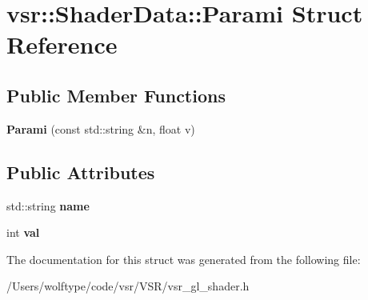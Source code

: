 \hypertarget{structvsr_1_1_shader_data_1_1_parami}{\section{vsr\-:\-:Shader\-Data\-:\-:Parami Struct Reference}
\label{structvsr_1_1_shader_data_1_1_parami}
}
\subsection*{Public Member Functions}
\begin{DoxyCompactItemize}
\item 
\hypertarget{structvsr_1_1_shader_data_1_1_parami_abd5f4840919c95cab63a5be23d2ae9c5}{{\bfseries Parami} (const std\-::string \&n, float v)}\label{structvsr_1_1_shader_data_1_1_parami_abd5f4840919c95cab63a5be23d2ae9c5}

\end{DoxyCompactItemize}
\subsection*{Public Attributes}
\begin{DoxyCompactItemize}
\item 
\hypertarget{structvsr_1_1_shader_data_1_1_parami_adc75868bc8856681d7b02a3b35dc772f}{std\-::string {\bfseries name}}\label{structvsr_1_1_shader_data_1_1_parami_adc75868bc8856681d7b02a3b35dc772f}

\item 
\hypertarget{structvsr_1_1_shader_data_1_1_parami_aa08530700622ba0c1a4091a938d5c661}{int {\bfseries val}}\label{structvsr_1_1_shader_data_1_1_parami_aa08530700622ba0c1a4091a938d5c661}

\end{DoxyCompactItemize}


The documentation for this struct was generated from the following file\-:\begin{DoxyCompactItemize}
\item 
/\-Users/wolftype/code/vsr/\-V\-S\-R/vsr\-\_\-gl\-\_\-shader.\-h\end{DoxyCompactItemize}
